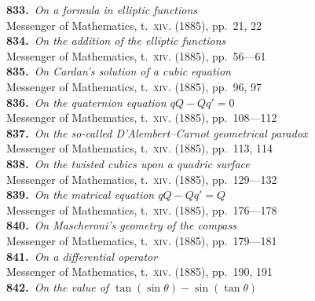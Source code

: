 \documentclass[11pt,a4paper]{article}
\providecommand{\textsc}[1]{{\scshape #1}}
\begin{document}
\small
\noindent\textbf{833.}~\textit{On a formula in elliptic functions}~\\
\hspace*{2em}Messenger of Mathematics, t.~\textsc{xiv}. (1885), pp.~21, 22\\[0.3em]
\textbf{834.}~\textit{On the addition of the elliptic functions}~\\
\hspace*{2em}Messenger of Mathematics, t.~\textsc{xiv}. (1885), pp.~56---61\\[0.3em]
\textbf{835.}~\textit{On Cardan's solution of a cubic equation}~\\
\hspace*{2em}Messenger of Mathematics, t.~\textsc{xiv}. (1885), pp.~96, 97\\[0.3em]
\textbf{836.}~\textit{On the quaternion equation $qQ-Qq'=0$}~\\
\hspace*{2em}Messenger of Mathematics, t.~\textsc{xiv}. (1885), pp.~108---112\\[0.3em]
\textbf{837.}~\textit{On the so-called D'Alembert--Carnot geometrical paradox}~\\
\hspace*{2em}Messenger of Mathematics, t.~\textsc{xiv}. (1885), pp.~113, 114\\[0.3em]
\textbf{838.}~\textit{On the twisted cubics upon a quadric surface}~\\
\hspace*{2em}Messenger of Mathematics, t.~\textsc{xiv}. (1885), pp.~129---132\\[0.3em]
\textbf{839.}~\textit{On the matrical equation $qQ-Qq'=Q$}~\\
\hspace*{2em}Messenger of Mathematics, t.~\textsc{xiv}. (1885), pp.~176---178\\[0.3em]
\textbf{840.}~\textit{On Mascheroni's geometry of the compass}~\\
\hspace*{2em}Messenger of Mathematics, t.~\textsc{xiv}. (1885), pp.~179---181\\[0.3em]
\textbf{841.}~\textit{On a differential operator}~\\
\hspace*{2em}Messenger of Mathematics, t.~\textsc{xiv}. (1885), pp.~190, 191\\[0.3em]
\textbf{842.}~\textit{On the value of $\tan(\sin\theta)-\sin(\tan\theta)$}~\\
\end{document}

